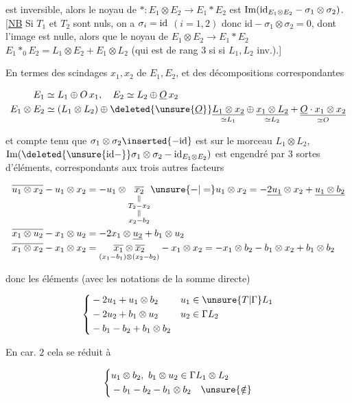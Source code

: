 

est inversible, alors le noyau de $*:E_1\otimes E_2\longrightarrow E_1*E_2$ est $\operatorname{Im}({\rm id}_{E_1\otimes E_2}-\sigma_1\otimes\sigma_2)$. [\uline{NB} Si $T_1$ et $T_2$ sont nuls, on a $\sigma_i={\rm id}$ $(i=1,2)$ donc $\mathrm{id}-\sigma_1\otimes\sigma_2=0$,
dont l'image est nulle, alors que le noyau de $E_1\otimes E_2\longrightarrow E_1*E_2$    $E_1*_{0}E_2=L_1\otimes E_2+E_1\otimes L_2$ (qui est de rang $3$ si si $L_1,L_2$ inv.).]

En termes des scindages $x_1,x_2$ de $E_1,E_2$, et des  décompositions correspondantes

\[ \begin{aligned} E_1&\simeq L_1\oplus O\,x_1,\quad E_2\simeq L_2\oplus\underline O\,x_2\\ E_1\otimes E_2&\simeq(L_1\otimes L_2)\oplus\deleted{\unsure{\underline O}}\underset{\simeq L_1}{\underline{L_1\otimes x_2}}\oplus\underset{\simeq L_2}{\underline{x_1\otimes L_2}}+\underset{\simeq O}{\underline{\underline O\cdot x_1\otimes x_2}} \end{aligned} \]

et compte tenu que $\sigma_1\otimes\sigma_2\inserted{-{\rm id}}$ est   sur le morceau $L_1\otimes L_2$,  $\operatorname{Im}(\deleted{\unsure{{\rm id}-}}\sigma_1\otimes\sigma_2-{\rm id}_{E_1\otimes E_2})$ est engendré par $3$ sortes d'éléments, correspondants aux trois autres facteurs

\[ \begin{aligned} \overline{u_1\otimes x_2}-u_1\otimes x_2&=-u_1\otimes\underset{\substack{\Vert\\T_2-x_2\\\Vert\\x_2-b_2}}{\overline{x_2}}\unsure{-|=}u_1\otimes x_2=-\underline{2u_1}\otimes x_2+\underline{u_1\otimes b_2}\\ \overline{x_1\otimes u_2}-x_1\otimes u_2&=-2x_1\otimes\underline{u_2}+b_1\otimes u_2\\ \overline{x_1\otimes x_2}-x_1\otimes x_2&=\underset{(x_1-b_1)\otimes(x_2-b_2)}{\overline{x_1}\otimes\overline{x_2}}-x_1\otimes x_2=-x_1\otimes b_2-b_1\otimes x_2+b_1\otimes b_2 \end{aligned} \]

donc les éléments (avec les notations de la somme directe)

\[ \left\{\begin{aligned}&-2u_1+u_1\otimes b_2 &&u_1\in\unsure{T|\Gamma} L_1\\ &-2u_2+b_1\otimes u_2 &&u_2\in\Gamma L_2\\ &-b_1-b_2+b_1\otimes b_2\end{aligned}\right. \]

En car. $2$ cela se réduit à

\[ \left\{\begin{aligned}&u_1\otimes b_2,\ b_1\otimes u_2\in\Gamma L_1\otimes L_2\\ &-b_1-b_2-b_1\otimes b_2\quad\unsure{\notin}\end{aligned}\right. \]
